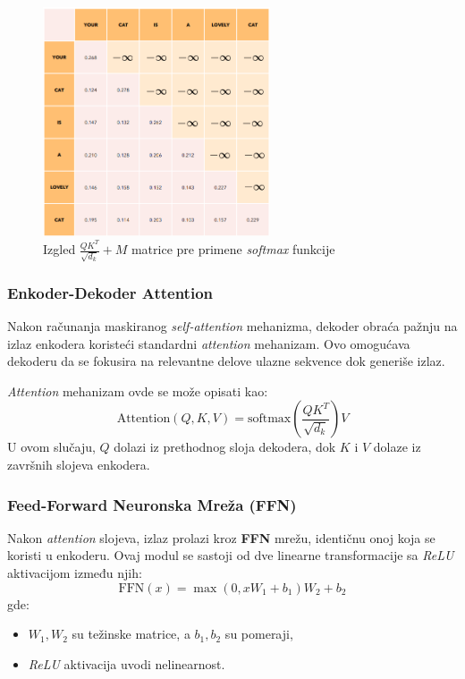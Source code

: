 \documentclass[12pt]{article}
\begin{document}
   \begin{figure}[h!]
      \centering
      \includegraphics[width=0.6\textwidth]{masked_attention.png}
      \caption{Izgled $\frac{QK^T}{\sqrt{d_k}} + M$ matrice pre primene \textit{softmax} funkcije}
      \label{fig:masked_attention}
   \end{figure}

   \subsubsection*{Enkoder-Dekoder Attention}

   Nakon računanja maskiranog \textit{self-attention} mehanizma, dekoder obraća pažnju na 
   izlaz enkodera koristeći standardni \textit{attention} mehanizam. Ovo omogućava dekoderu da 
   se fokusira na relevantne delove ulazne sekvence dok generiše izlaz.

   \textit{Attention} mehanizam ovde se može opisati kao:
   \[
   \text{Attention}(Q, K, V) = \text{softmax}\left(\frac{QK^T}{\sqrt{d_k}}\right)V
   \]
   U ovom slučaju, \( Q \) dolazi iz prethodnog sloja dekodera, dok \( K \) i \( V \) 
   dolaze iz završnih slojeva enkodera.

   \subsubsection*{Feed-Forward Neuronska Mreža (FFN)}
   Nakon \textit{attention} slojeva, izlaz prolazi kroz \textbf{FFN} mrežu, 
   identičnu onoj koja se koristi u enkoderu. Ovaj modul se sastoji od dve 
   linearne transformacije sa \textit{ReLU} aktivacijom između njih:
   \[
   \text{FFN}(x) = \max(0, xW_1 + b_1)W_2 + b_2
   \]
   gde:
   \begin{itemize}
      \item \( W_1, W_2 \) su težinske matrice, a \( b_1, b_2 \) su pomeraji,
      \item \textit{ReLU} aktivacija uvodi nelinearnost.
   \end{itemize}
\end{document}
